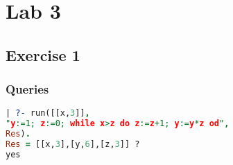 \section{Lab 3}
\subsection{Exercise 1}

\subsubsection{Queries}
\begin{lstlisting}[language=Prolog]
| ?- run([[x,3]],
"y:=1; z:=0; while x>z do z:=z+1; y:=y*z od",
Res).
Res = [[x,3],[y,6],[z,3]] ?
yes
\end{lstlisting}